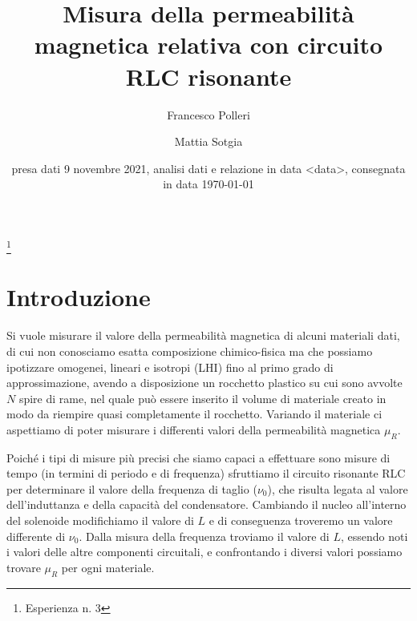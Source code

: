 \documentclass[
    rmp,
    reprint, 
    superscriptaddress, 
    altaffilletter, 
    amsmath, 
    amssymb, 
    a4paper]{revtex4-2}
\begin{document}
\title{Misura della permeabilità magnetica relativa con circuito RLC risonante
}
\thanks{Esperienza n. 3
}

\author{Francesco Polleri}
\author{Mattia Sotgia}


\date{presa dati
    9 novembre 2021, analisi dati e relazione in data <data>, consegnata in data
    \today
}

\begin{abstract}
    
\end{abstract}
\maketitle
\thispagestyle{fancy}


\section*{Introduzione}\label{sec:introduction}
Si vuole misurare il valore della permeabilità magnetica di alcuni materiali dati, di cui non conosciamo esatta composizione chimico-fisica ma che possiamo ipotizzare omogenei, lineari e isotropi (LHI) fino al primo grado di approssimazione, avendo a disposizione un rocchetto plastico su cui sono avvolte $N$ spire di rame, nel quale può essere inserito il volume di materiale creato in modo da riempire quasi completamente il rocchetto. Variando il materiale ci aspettiamo di poter misurare i differenti valori della permeabilità magnetica $\mu_R$. 

Poiché i tipi di misure più precisi che siamo capaci a effettuare sono misure di tempo (in termini di periodo e di frequenza) sfruttiamo il circuito risonante RLC per determinare il valore della frequenza di taglio ($\nu_0$), che risulta legata al valore dell'induttanza e della capacità del condensatore. Cambiando il nucleo all'interno del solenoide modifichiamo il valore di $L$ e di conseguenza troveremo un valore differente di $\nu_0$. Dalla misura della frequenza troviamo il valore di $L$, essendo noti i valori delle altre componenti circuitali, e confrontando i diversi valori possiamo trovare $\mu_R$ per ogni materiale.
\end{document}

